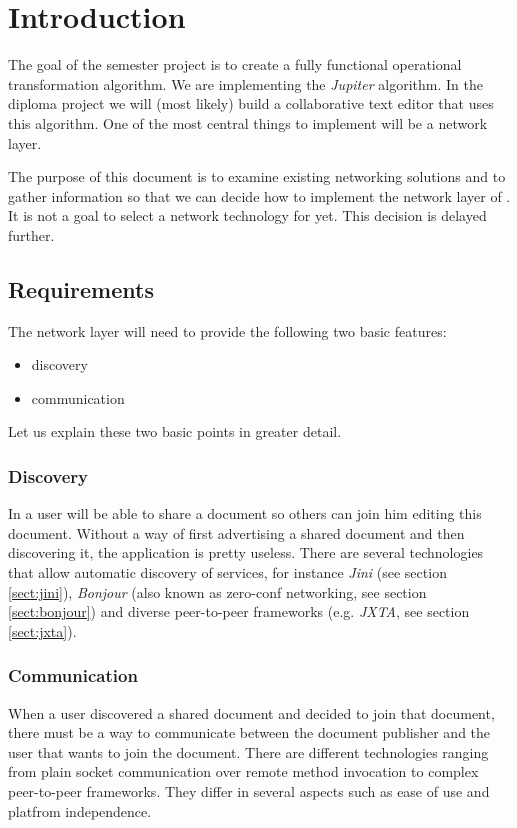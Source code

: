 \section{Introduction}
The goal of the semester project is to create a fully functional operational transformation algorithm. We are implementing the \emph{Jupiter} algorithm. In the diploma project we will (most likely) build a collaborative text editor that uses this algorithm. One of the most central things to implement will be a network layer. 

The purpose of this document is to examine existing networking solutions and to gather information so that we can decide how to implement the network layer of \ace. It is not a goal to select a network technology for \ace yet. This decision is delayed further. 


\subsection{Requirements}
\label{sect:requirements}
The network layer will need to provide the following two basic features:

\begin{itemize}
 \item discovery
 \item communication
\end{itemize}

Let us explain these two basic points in greater detail.

\subsubsection{Discovery}
In \ace a user will be able to share a document so others can join him editing this document. Without a way of first advertising a shared document and then discovering it, the application is pretty useless. There are several technologies that allow automatic discovery of services, for instance \emph{Jini} (see section \ref{sect:jini}), \emph{Bonjour} (also known as zero-conf networking, see section \ref{sect:bonjour}) and diverse peer-to-peer frameworks (e.g. \emph{JXTA}, see section \ref{sect:jxta}).

\subsubsection{Communication}
When a user discovered a shared document and decided to join that document, there must be a way to communicate between the document publisher and the user that wants to join the document. There are different technologies ranging from plain socket communication over remote method invocation to complex peer-to-peer frameworks. They differ in several aspects such as ease of use and platfrom independence.

